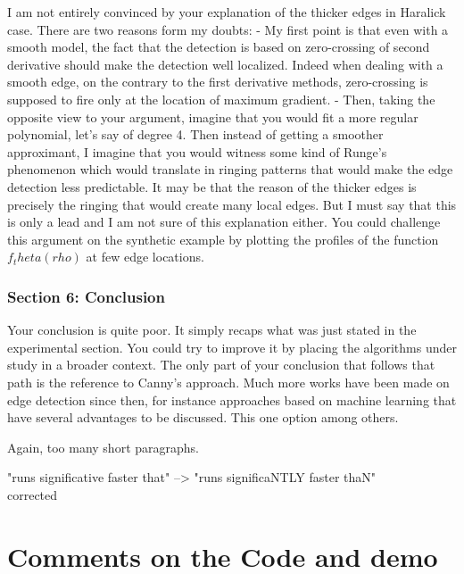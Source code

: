 \documentclass[a4paper,10pt]{report}
\begin{document}
I am not entirely convinced by your explanation of the thicker edges in
Haralick case. There are two reasons form my doubts:
- My first point is that even with a smooth model, the fact that the detection
is based on zero-crossing of second derivative should make the detection well localized. Indeed when dealing with a smooth edge, on the contrary to the
first derivative methods, zero-crossing is supposed to fire only at the
location of maximum gradient.
- Then, taking the opposite view to your argument, imagine that you would fit a more regular polynomial, let's say of degree 4. Then instead of getting a
smoother approximant, I imagine that you would witness some kind of Runge's
phenomenon which would translate in ringing patterns that would make the edge detection less predictable. It may be that the reason of the thicker edges is precisely the ringing that would create many local edges. But I must say that
this is only a lead and I am not sure of this explanation either. You could
challenge this argument on the synthetic example by plotting the profiles of
the function $f_theta(rho)$ at few edge locations.


\subsubsection{ Section 6: Conclusion}
Your conclusion is quite poor. It simply recaps what was just stated in the
experimental section. You could try to improve it by placing the
algorithms under study in a broader context. The only part of your conclusion
that follows that path is the reference to Canny's approach. Much more
works have been made on edge detection since then, for instance approaches
based on machine learning that have several advantages to be discussed. This one option among others.

Again, too many short paragraphs.

\que "runs significative faster that" --> "runs significaNTLY faster thaN"\\

\ans corrected\\

\section{ Comments on the Code and demo}
\end{document}
